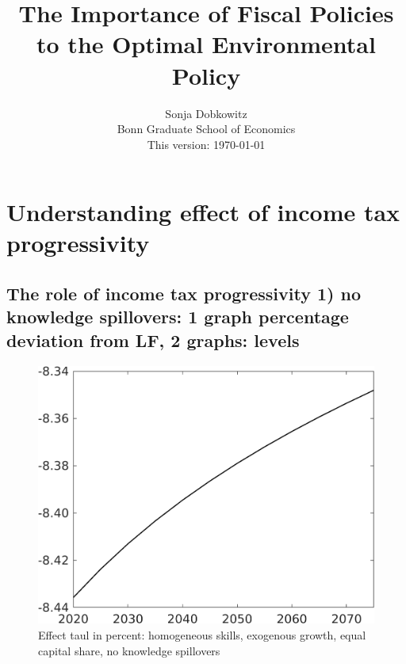 \documentclass[12pt]{article}
\title{The Importance of Fiscal Policies to the Optimal Environmental Policy}
\date{Sonja Dobkowitz\\ Bonn Graduate School of Economics\\ %
	\vspace{1mm}
	This version: \today }
\begin{document}
\section{Understanding effect of income tax progressivity}
\subsection{The role of income tax progressivity 1) no knowledge spillovers: 1 graph percentage deviation from LF, 2 graphs: levels}
\begin{figure}[h!!]
	\centering
	\caption{Effect taul in percent: homogeneous skills, exogenous growth, equal capital share, no knowledge spillovers }\label{fig:LF_BAU_nsk1_xgr1_equalcapShare_noknow}
	\begin{minipage}[]{0.32\textwidth}
		\includegraphics[width=1\textwidth]{../../codding_model/own_basedOnFried/optimalPol_010922_revision/figures/all_13Sept22/CompTaul_Equlab_LFBAUPer_Reg0_Emnet_spillover0_nsk1_xgr1_knspil1_sep1_countec0_GovRev0_etaa0.79.png}
	\end{minipage}	
	\begin{minipage}[]{0.32\textwidth}

\end{minipage}
\end{figure}
\end{document}
